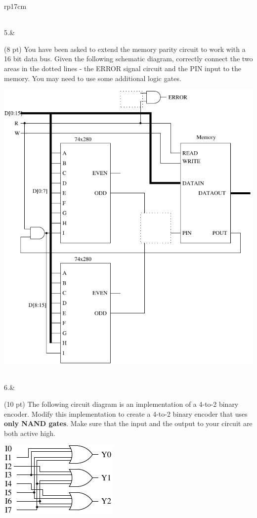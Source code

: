 \documentclass{article}
\begin{document}
\begin{longtable}[l]{rp{17cm}}
\begin{minipage}[t]{\linewidth}
\vspace{8cm
}
\end{minipage}\\
\medskip
5.&\begin{minipage}[t]{\linewidth}(8 pt) You have been asked to extend the memory parity circuit to work with a 16 bit data bus.  Given the following schematic diagram, correctly connect the two areas in the dotted lines - the ERROR signal circuit and the PIN input to the memory.  You may need to use some additional logic gates.
\begin{center}
  \includegraphics[scale=0.5]{../XOR/Assessments/MemoryCircuitParityExtended}
\end{center}

\vspace{6cm
}
\end{minipage}\\
\medskip
6.&\begin{minipage}[t]{\linewidth}(10 pt) The following circuit diagram is an implementation of a 4-to-2 binary encoder.  Modify this implementation to create a 4-to-2 binary encoder that uses \textbf{only NAND gates}.  Make sure that the input and the output to your circuit are both active high.
\begin{center}
  \includegraphics{../Encoders/Assessments/BinaryEncoderLogic}
\end{center}


\end{minipage}
\end{longtable}
\end{document}
